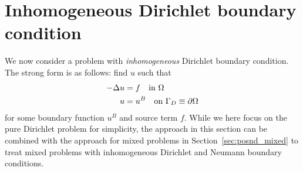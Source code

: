 

\section{Inhomogeneous Dirichlet boundary condition}
\label{sec:posnd_inhomo_bc}
We now consider a problem with \emph{inhomogeneous} Dirichlet boundary condition.  The strong form is as follows: find $u$ such that
\begin{align}
  -\Delta u &= f \quad \text{in } \Omega \label{eq:posnd_inhomo_bc_strong} \\
  u &= u^B \quad \text{on } \Gamma_D \equiv \partial \Omega \notag
\end{align}
for some boundary function $u^B$ and source term $f$. While we here focus on the pure Dirichlet problem for simplicity, the approach in this section can be combined with the approach for mixed problems in Section~\ref{sec:posnd_mixed} to treat mixed problems with inhomogeneous Dirichlet and Neumann boundary conditions.


